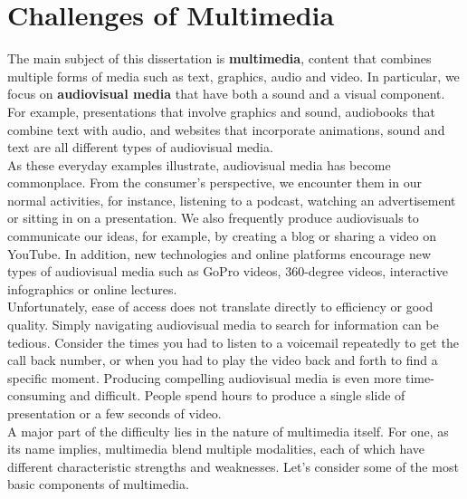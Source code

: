 \section{Challenges of Multimedia}
The main subject of this dissertation is \textbf{multimedia}, content that combines multiple forms of media such as text, graphics, audio and video. In particular, we focus on \textbf{audiovisual media} that have both a sound and a visual component. For example, presentations that involve graphics and sound, audiobooks that combine text with audio, and websites that incorporate animations, sound and text are all different types of audiovisual media. \\
As these everyday examples illustrate, audiovisual media has become commonplace. From the consumer's perspective, we encounter them in our normal activities, for instance, listening to a podcast, watching an advertisement or sitting in on a presentation. We also frequently produce audiovisuals to communicate our ideas, for example, by creating a blog or sharing a video on YouTube. In addition, new technologies and online platforms encourage new types of audiovisual media such as GoPro videos, 360-degree videos, interactive infographics or online lectures.\\ 
Unfortunately, ease of access does not translate directly to efficiency or good quality. Simply navigating audiovisual media to search for information can be tedious. Consider the times you had to listen to a voicemail repeatedly to get the call back number, or when you had to play the video back and forth to find a specific moment. Producing compelling audiovisual media is even more time-consuming and difficult. People spend hours to produce a single slide of presentation or a few seconds of video.\\ 
A major part of the difficulty lies in the nature of multimedia itself. For one, as its name implies, multimedia blend multiple modalities, each of which have different characteristic strengths and weaknesses. Let's consider some of the most basic components of multimedia.
